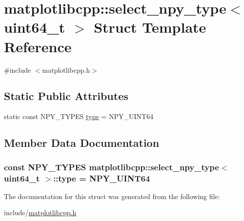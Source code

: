 \hypertarget{structmatplotlibcpp_1_1select__npy__type_3_01uint64__t_01_4}{}\section{matplotlibcpp\+:\+:select\+\_\+npy\+\_\+type$<$ uint64\+\_\+t $>$ Struct Template Reference}
\label{structmatplotlibcpp_1_1select__npy__type_3_01uint64__t_01_4}


{\ttfamily \#include $<$matplotlibcpp.\+h$>$}

\subsection*{Static Public Attributes}
\begin{DoxyCompactItemize}
\item 
static const N\+P\+Y\+\_\+\+T\+Y\+P\+ES \hyperlink{structmatplotlibcpp_1_1select__npy__type_3_01uint64__t_01_4_a8d5871452f90ff04452f0416bee54fca}{type} = N\+P\+Y\+\_\+\+U\+I\+N\+T64
\end{DoxyCompactItemize}


\subsection{Member Data Documentation}
\subsubsection[{\texorpdfstring{type}{type}}]{\setlength{\rightskip}{0pt plus 5cm}const N\+P\+Y\+\_\+\+T\+Y\+P\+ES {\bf matplotlibcpp\+::select\+\_\+npy\+\_\+type}$<$ uint64\+\_\+t $>$\+::type = N\+P\+Y\+\_\+\+U\+I\+N\+T64\hspace{0.3cm}{\ttfamily [static]}}\hypertarget{structmatplotlibcpp_1_1select__npy__type_3_01uint64__t_01_4_a8d5871452f90ff04452f0416bee54fca}{}\label{structmatplotlibcpp_1_1select__npy__type_3_01uint64__t_01_4_a8d5871452f90ff04452f0416bee54fca}


The documentation for this struct was generated from the following file\+:\begin{DoxyCompactItemize}
\item 
include/\hyperlink{matplotlibcpp_8h}{matplotlibcpp.\+h}\end{DoxyCompactItemize}

